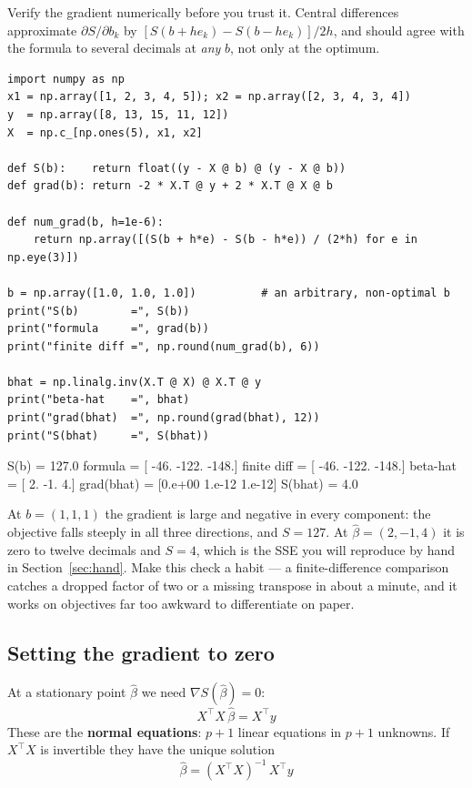 \documentclass[11pt]{article}
\newcommand{\Xt}{X^{\!\top}}
\begin{document}
\begin{tryit}
Verify the gradient numerically before you trust it. Central differences
approximate $\partial S/\partial b_k$ by $[S(b + he_k) - S(b - he_k)]/2h$,
and should agree with the formula to several decimals at \emph{any} $b$, not
only at the optimum.

\begin{lstlisting}
import numpy as np
x1 = np.array([1, 2, 3, 4, 5]); x2 = np.array([2, 3, 4, 3, 4])
y  = np.array([8, 13, 15, 11, 12])
X  = np.c_[np.ones(5), x1, x2]

def S(b):    return float((y - X @ b) @ (y - X @ b))
def grad(b): return -2 * X.T @ y + 2 * X.T @ X @ b

def num_grad(b, h=1e-6):
    return np.array([(S(b + h*e) - S(b - h*e)) / (2*h) for e in np.eye(3)])

b = np.array([1.0, 1.0, 1.0])          # an arbitrary, non-optimal b
print("S(b)        =", S(b))
print("formula     =", grad(b))
print("finite diff =", np.round(num_grad(b), 6))

bhat = np.linalg.inv(X.T @ X) @ X.T @ y
print("beta-hat    =", bhat)
print("grad(bhat)  =", np.round(grad(bhat), 12))
print("S(bhat)     =", S(bhat))
\end{lstlisting}
\begin{codeout}
S(b)        = 127.0
formula     = [ -46. -122. -148.]
finite diff = [ -46. -122. -148.]
beta-hat    = [ 2. -1.  4.]
grad(bhat)  = [0.e+00 1.e-12 1.e-12]
S(bhat)     = 4.0
\end{codeout}

At $b = (1,1,1)$ the gradient is large and negative in every component: the
objective falls steeply in all three directions, and $S = 127$. At
$\hat\beta = (2,-1,4)$ it is zero to twelve decimals and $S = 4$, which is
the SSE you will reproduce by hand in Section~\ref{sec:hand}. Make this check
a habit --- a finite-difference comparison catches a dropped factor of two or
a missing transpose in about a minute, and it works on objectives far too
awkward to differentiate on paper.
\end{tryit}

\subsection{Setting the gradient to zero}

At a stationary point $\hat\beta$ we need $\nabla S(\hat\beta) = 0$:
\begin{equation}
  \label{eq:normal}
  \boxed{\;\Xt X\,\hat\beta = \Xt y\;}
\end{equation}
These are the \textbf{normal equations}: $p+1$ linear equations in $p+1$
unknowns. If $\Xt X$ is invertible they have the unique solution
\begin{equation}
  \label{eq:betahat}
  \boxed{\;\hat\beta = (\Xt X)^{-1}\,\Xt y\;}
\end{equation}
\end{document}

